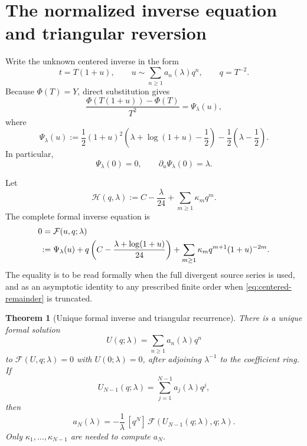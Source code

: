 \documentclass[11pt,oneside]{article}
\theoremstyle{plain}
\newtheorem{theorem}{Theorem}[section]
\theoremstyle{definition}
\theoremstyle{remark}
\newcommand{\Fcal}{\mathcal{F}}
\newcommand{\Hcal}{\mathcal{H}}
\begin{document}
\section{The normalized inverse equation and triangular reversion}
\label{sec:implicit-equation}

Write the unknown centered inverse in the form
\begin{equation}
 t=T(1+u),
 \qquad
 u\sim\sum_{n\ge1}a_n(\lambda)q^n,
 \qquad q=T^{-2}.
 \label{eq:u-ansatz}
\end{equation}
Because \(\Phi(T)=Y\), direct substitution gives
\begin{equation}
 \frac{\Phi(T(1+u))-\Phi(T)}{T^2}
 =\Psi_\lambda(u),
 \label{eq:Psi-origin}
\end{equation}
where
\begin{equation}
 \Psi_\lambda(u)
 :=\frac12(1+u)^2
       \left(\lambda+\log(1+u)-\frac12\right)
   -\frac12\left(\lambda-\frac12\right).
 \label{eq:Psi-def}
\end{equation}
In particular,
\begin{equation}
 \Psi_\lambda(0)=0,
 \qquad \partial_u\Psi_\lambda(0)=\lambda.
 \label{eq:Psi-linear}
\end{equation}

Let
\begin{equation}
 \Hcal(q,\lambda)
 :=C-\frac{\lambda}{24}+\sum_{m\ge1}\kappa_mq^m.
 \label{eq:Hcal-K}
\end{equation}
The complete formal inverse equation is
\begin{align}
 0={}&\Fcal(u,q;\lambda)
 \notag\\
 :={}&\Psi_\lambda(u)
 +q\left(C-\frac{\lambda+\log(1+u)}{24}\right)
 +\sum_{m\ge1}\kappa_mq^{m+1}(1+u)^{-2m}.
 \label{eq:normalized-implicit}
\end{align}
The equality is to be read formally when the full divergent source series is
used, and as an asymptotic identity to any prescribed finite order when
\cref{eq:centered-remainder} is truncated.

\begin{theorem}[Unique formal inverse and triangular recurrence]
\label{thm:triangular-recurrence}
There is a unique formal solution
\begin{equation}
 U(q;\lambda)=\sum_{n\ge1}a_n(\lambda)q^n
 \label{eq:U-formal}
\end{equation}
to \(\Fcal(U,q;\lambda)=0\) with \(U(0;\lambda)=0\), after adjoining
\(\lambda^{-1}\) to the coefficient ring.  If
\begin{equation}
 U_{N-1}(q;\lambda)=\sum_{j=1}^{N-1}a_j(\lambda)q^j,
 \label{eq:UNminus1}
\end{equation}
then
\begin{equation}
 a_N(\lambda)
 =-\frac1\lambda\,[q^N]\,
   \Fcal\!\left(U_{N-1}(q;\lambda),q;\lambda\right).
 \label{eq:triangular-recurrence}
\end{equation}
Only \(\kappa_1,\ldots,\kappa_{N-1}\) are needed to compute \(a_N\).
\end{theorem}
\end{document}

